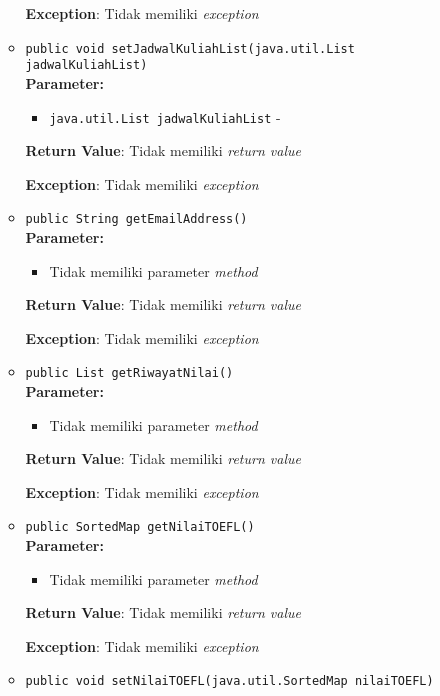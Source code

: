 \documentclass{article}
\begin{document}
\begin{enumerate}
\begin{itemize}
\textbf{Exception}: Tidak memiliki \textit{exception}

\item \texttt{public void setJadwalKuliahList(java.util.List jadwalKuliahList)}\\ 


\textbf{Parameter:}\begin{itemize}
\item \texttt{java.util.List jadwalKuliahList} - 
\end{itemize}
\textbf{Return Value}: Tidak memiliki \textit{return value}

\textbf{Exception}: Tidak memiliki \textit{exception}

\item \texttt{public String getEmailAddress()}\\ 


\textbf{Parameter:}\begin{itemize}
\item Tidak memiliki parameter \textit{method}
\end{itemize}
\textbf{Return Value}: Tidak memiliki \textit{return value}

\textbf{Exception}: Tidak memiliki \textit{exception}

\item \texttt{public List getRiwayatNilai()}\\ 


\textbf{Parameter:}\begin{itemize}
\item Tidak memiliki parameter \textit{method}
\end{itemize}
\textbf{Return Value}: Tidak memiliki \textit{return value}

\textbf{Exception}: Tidak memiliki \textit{exception}

\item \texttt{public SortedMap getNilaiTOEFL()}\\ 


\textbf{Parameter:}\begin{itemize}
\item Tidak memiliki parameter \textit{method}
\end{itemize}
\textbf{Return Value}: Tidak memiliki \textit{return value}

\textbf{Exception}: Tidak memiliki \textit{exception}

\item \texttt{public void setNilaiTOEFL(java.util.SortedMap nilaiTOEFL)}\\ 



\end{itemize}
\end{enumerate}
\end{document}
